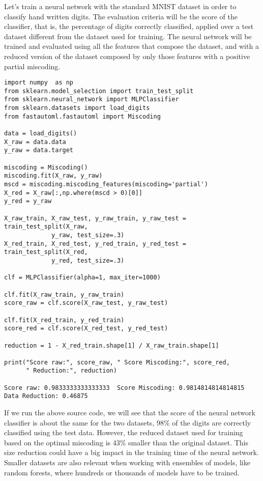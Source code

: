 \begin{example}
Let's train a neural network with the standard MNIST dataset in order to classify hand written digits. The evaluation criteria will be the score of the classifier, that is, the percentage of digits correctly classified, applied over a test dataset different from the dataset used for training. The neural network will be trained and evaluated using all the features that compose the dataset, and with a reduced version of the dataset composed by only those features with a positive partial miscoding.

\begin{sourcecode}
{\scriptsize \begin{verbatim}
import numpy  as np
from sklearn.model_selection import train_test_split
from sklearn.neural_network import MLPClassifier
from sklearn.datasets import load_digits
from fastautoml.fastautoml import Miscoding

data = load_digits()
X_raw = data.data
y_raw = data.target

miscoding = Miscoding()
miscoding.fit(X_raw, y_raw)
mscd = miscoding.miscoding_features(miscoding='partial')
X_red = X_raw[:,np.where(mscd > 0)[0]]
y_red = y_raw

X_raw_train, X_raw_test, y_raw_train, y_raw_test = train_test_split(X_raw,
             y_raw, test_size=.3)
X_red_train, X_red_test, y_red_train, y_red_test = train_test_split(X_red,
             y_red, test_size=.3)

clf = MLPClassifier(alpha=1, max_iter=1000)

clf.fit(X_raw_train, y_raw_train)
score_raw = clf.score(X_raw_test, y_raw_test)
        
clf.fit(X_red_train, y_red_train)
score_red = clf.score(X_red_test, y_red_test)
        
reduction = 1 - X_red_train.shape[1] / X_raw_train.shape[1]

print("Score raw:", score_raw, " Score Miscoding:", score_red,
      " Reduction:", reduction)

Score raw: 0.9833333333333333  Score Miscoding: 0.9814814814814815  Data Reduction: 0.46875
\end{verbatim}}
\end{sourcecode}

If we run the above source code, we will see that the score of the neural network classifier is about the same for the two datasets, 98\% of the digits are correctly classified using the test data. However, the reduced dataset used for training based on the optimal miscoding is 43\% smaller than the original dataset. This size reduction could have a big impact in the training time of the neural network. Smaller datasets are also relevant when working with ensembles of models, like random forests, where hundreds or thousands of models have to be trained.

\end{example}

